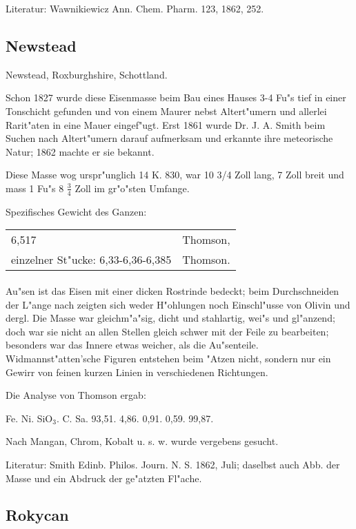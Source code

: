 \documentclass[a4paper, 11pt, oneside]{article}
\begin{document}
Literatur: Wawnikiewicz Ann. Chem. Pharm. 123, 1862, 252.

\subsection{Newstead}

Newstead, Roxburghshire, Schottland.

Schon 1827 wurde diese Eisenmasse beim Bau eines Hauses 3-4 Fu"s tief in einer Tonschicht gefunden und von einem Maurer nebst Altert"umern und allerlei Rarit"aten in eine Mauer eingef"ugt. Erst 1861 wurde Dr. J. A. Smith beim Suchen nach Altert"umern darauf aufmerksam und erkannte ihre meteorische Natur; 1862 machte er sie bekannt.

Diese Masse wog urspr"unglich 14 K. 830, war 10 3/4 Zoll lang, 7 Zoll breit und mass 1 Fu"s 8 $\frac{3}{4}$ Zoll im gr"o"sten Umfange.

Spezifisches Gewicht des Ganzen:
\begin{table}[!ht]
    \centering
    \begin{tabular}{l l}
        6,517 & Thomson,\\
        einzelner St"ucke: 6,33-6,36-6,385 & Thomson.
    \end{tabular}
\end{table}
\paragraph{}
Au"sen ist das Eisen mit einer dicken Rostrinde bedeckt; beim Durchschneiden der L"ange nach zeigten sich weder H"ohlungen noch Einschl"usse von Olivin und dergl. Die Masse war gleichm"a"sig, dicht und stahlartig, wei"s und gl"anzend; doch war sie nicht an allen Stellen gleich schwer mit der Feile zu bearbeiten; besonders war das Innere etwas weicher, als die Au"senteile. Widmannst"atten'sche Figuren entstehen beim "Atzen nicht, sondern nur ein Gewirr von feinen kurzen Linien in verschiedenen Richtungen.

Die Analyse von Thomson ergab:

Fe. Ni. SiO$_{3}$. C. Sa.  
93,51. 4,86. 0,91. 0,59. 99,87.

Nach Mangan, Chrom, Kobalt u. s. w. wurde vergebens gesucht.

Literatur: Smith Edinb. Philos. Journ. N. S. 1862, Juli; daselbst auch Abb. der Masse und ein Abdruck der ge"atzten Fl"ache.

\subsection{Rokycan}
\end{document}
